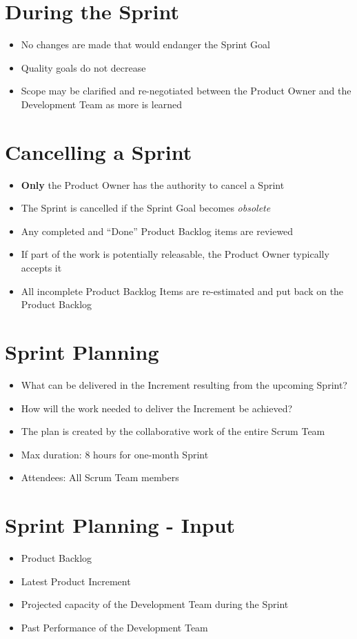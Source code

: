 \documentclass[a4paper,11pt,twocolumn]{article}
\begin{document}
\section*{During the Sprint}
\begin{itemize}
    \item No changes are made that would endanger the Sprint Goal
	\item Quality goals do not decrease
	\item Scope may be clarified and re-negotiated between the Product Owner and the Development Team as more is learned
\end{itemize}

\section*{Cancelling a Sprint}
\begin{itemize}
    \item \textbf{Only} the Product Owner has the authority to cancel a Sprint
	\item The Sprint is cancelled if the Sprint Goal becomes \textit{obsolete}
	\item Any completed and ``Done'' Product Backlog items are reviewed
    \item If part of the work is potentially releasable, the Product Owner typically accepts it
    \item All incomplete Product Backlog Items are re-estimated and put back on the Product Backlog
\end{itemize}

\section*{Sprint Planning}
\begin{itemize}
    \item What can be delivered in the Increment resulting from the upcoming Sprint?
	\item How will the work needed to deliver the Increment be achieved?
	\item The plan is created by the collaborative work of the entire Scrum Team
	\item Max duration: 8 hours for one-month Sprint
	\item Attendees: All Scrum Team members
\end{itemize}

\section*{Sprint Planning - Input}
\begin{itemize}
    \item Product Backlog
    \item Latest Product Increment
    \item Projected capacity of the Development Team during the Sprint
    \item Past Performance of the Development Team
\end{itemize}
\end{document}
